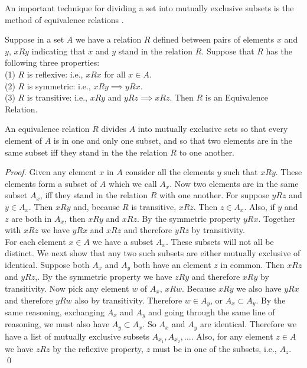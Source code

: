 An important technique for dividing a set into mutually exclusive subsets is the method of equivalence relations \cite{Hall}.
\begin{definition}
Suppose in a set $A$ we have a relation $R$ defined between pairs of elements $x$ and $y$, $x R y$ indicating that $x$ and $y$ stand in the relation $R$. 
Suppose that $R$ has the following three properties: \\

(1) $R$ is reflexive: i.e., $x R x$ for all $x\in A$.\\
(2) $R$ is symmetric: i.e., $x R y \implies y R x$.\\
(3) $R$ is transitive: i.e., $x R y$ and $y R z \implies x R z$.
Then $R$ is an {\elevenit Equivalence Relation}.
\end{definition}
\begin{theorem}
An equivalence relation $R$ divides $A$ into mutually exclusive sets so that every element of $A$ is in one and only one subset, and so that two elements are in the same 
subset iff they stand in the the relation $R$ to one another. 
\end{theorem}
\begin{proof}
Given any element $x$ in $A$ consider all the elements $y$ such that $x R y$. These elements form a subset of $A$ which we call $A_x$. Now two elements are in the same subset $A_x$, iff they stand 
in the relation $R$ with one another. For suppose $y R z$ and $y \in A_x$. Then $x R y$ and, because $R$ is transitive, $x R z$. Then $z \in A_x$. Also, if $y$ and $z$ are both in $A_x$, then $x R y$ and 
$x R z$. By the symmetric property $y R x$. Together with $x R z$ we have $y R x$ and $x R z$ and therefore $y R z$ by transitivity.\\

For each element $x \in A$ we have a subset $A_x$. These subsets will not all be distinct. We next show that any two such subsets are either mutually exclusive of identical. Suppose both $A_x$ and $A_y$ both have an element $z$ in common. Then $x R z$ and $y R z$,. By the symmetric property we have $z R y$ and therefore $x R y$ by transitivity. Now pick any element $w$ of $A_x$, $x R w$. Because 
$x R y$ we also have $y R x$ and therefore $y R w$ also by transitivity. Therefore $w \in A_y$, or $A_x \subset A_y$. By the same reasoning, exchanging $A_x$ and $A_y$ and going through the same line of reasoning, we must also have $A_y \subset A_x$. So $A_x$ and $A_y$ are identical. Therefore we have a list of mutually exclusive subsets $A_{x_1}, A_{x_2}, \hdots$. Also, for any element $z \in A$ we have $z R z$ by the reflexive property, $z$ must be in one of the subsets, i.e., $A_z$. \qed
\end{proof}

